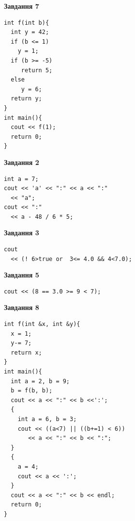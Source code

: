 \documentclass[12pt, ukrainian]{article}
\begin{document}
{\begin {large}
\begin{minipage}[t]{7.0cm}
\begin{center}
\textbf{Завдання 7}
\end{center}
\vspace{-8mm}

\begin{verbatim}
int f(int b){
  int y = 42;
  if (b <= 1)
    y = 1;
  if (b >= -5)
     return 5;
  else
     y = 6;
  return y;
}
int main(){
  cout << f(1);
  return 0;
}
\end{verbatim}

\end{minipage}
\vline \hspace{1mm}
\begin{minipage}[t]{11.0cm}

\begin{center}
\textbf{Завдання 2}
\end{center}
\vspace{-8mm}

\begin{verbatim}
int a = 7;
cout << 'a' << ":" << a << ":" 
  << "a";
cout << ":" 
  << a - 48 / 6 * 5;
\end{verbatim}



\begin{center}
\textbf{Завдання 3}
\end{center}
\vspace{-8mm}

\begin{verbatim}
cout 
  << (! 6>true or  3<= 4.0 && 4<7.0);
\end{verbatim}



\begin{center}
\textbf{Завдання 5}
\end{center}
\vspace{-8mm}

\begin{verbatim}
cout << (8 == 3.0 >= 9 < 7);
\end{verbatim}



\begin{center}
\textbf{Завдання 8}
\end{center}
\vspace{-8mm}

\begin{verbatim}
int f(int &x, int &y){
  x = 1;
  y-= 7;
  return x;
}
int main(){
  int a = 2, b = 9;
  b = f(b, b);
  cout << a << ":" << b <<':';
  {
    int a = 6, b = 3;
    cout << ((a<7) || ((b+=1) < 6))
       << a << ":" << b << ":";
  }
  {
    a = 4;
    cout << a << ':';
  }
  cout << a << ":" << b << endl;
  return 0;
}
\end{verbatim}


\end{minipage}
\end{large}}
\end{document}
